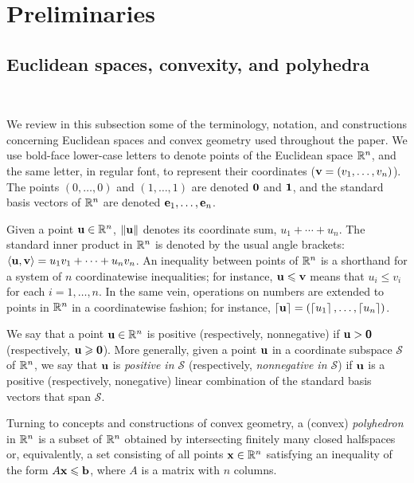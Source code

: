 \documentclass[11pt]{amsart}
\begin{document}
\section{Preliminaries}

\subsection{Euclidean spaces, convexity, and polyhedra} 

\ 

We review in this subsection some of the terminology, notation, and constructions concerning Euclidean spaces and convex geometry used throughout the paper.
We use bold-face lower-case letters to denote points of the Euclidean space $\mathbb{R}^n$, and the same letter, in regular font, to represent their coordinates (\eg $\mathbf{v}=(v_1,\ldots,v_n)$).
The points $(0,\ldots,0)$ and $(1,\ldots,1)$ are denoted $\mathbf{0}$ and $\mathbf{1}$, and the standard basis vectors of $\mathbb{R}^n$ are denoted $\mathbf{e}_1,\ldots,\mathbf{e}_n$.

Given a point $\mathbf{u}\in \mathbb{R}^n$, $\| \mathbf{u} \|$ denotes its coordinate sum, $u_1+\cdots+u_n$.
The standard inner product in $\mathbb{R}^n$ is denoted by the usual angle brackets: $\langle \mathbf{u}, \mathbf{v} \rangle = u_1v_1 + \cdots + u_nv_n$.
An inequality between points of $\mathbb{R}^n$ is a shorthand for a system of $n$ coordinatewise inequalities; for instance, $\mathbf{u}\leqslant \mathbf{v}$ means that $u_i \le v_i$ for each $i=1,\ldots,n$.
In the same vein, operations on numbers are extended to points in $\mathbb{R}^n$ in a coordinatewise fashion; for instance, $\left\lceil \mathbf{u} \right\rceil=(\left\lceil u_1 \right\rceil,\ldots,\left\lceil u_n \right\rceil)$.

We say that a point $\mathbf{u}\in \mathbb{R}^n$ is positive (respectively, nonnegative) if $\mathbf{u} > \mathbf{0}$ (respectively, $\mathbf{u}\geqslant \mathbf{0}$).
More generally, given a point $\mathbf{u}$ in a coordinate subspace $\mathcal{S}$ of $\mathbb{R}^n$, we say that $\mathbf{u}$ is \emph{positive in $\mathcal{S}$} (respectively, \emph{nonnegative in $\mathcal{S}$}) if $\mathbf{u}$ is a positive (respectively, nonegative) linear combination of the standard basis vectors that span $\mathcal{S}$.

Turning to concepts and constructions of convex geometry, a (convex) \emph{polyhedron} in $\mathbb{R}^n$ is a subset of $\mathbb{R}^n$ obtained by intersecting finitely many closed halfspaces or, equivalently, a set consisting of all points $\mathbf{x}\in \mathbb{R}^n$ satisfying an inequality of the form $A\mathbf{x}\leqslant \mathbf{b}$, where $A$ is a matrix with $n$ columns.
\end{document}
